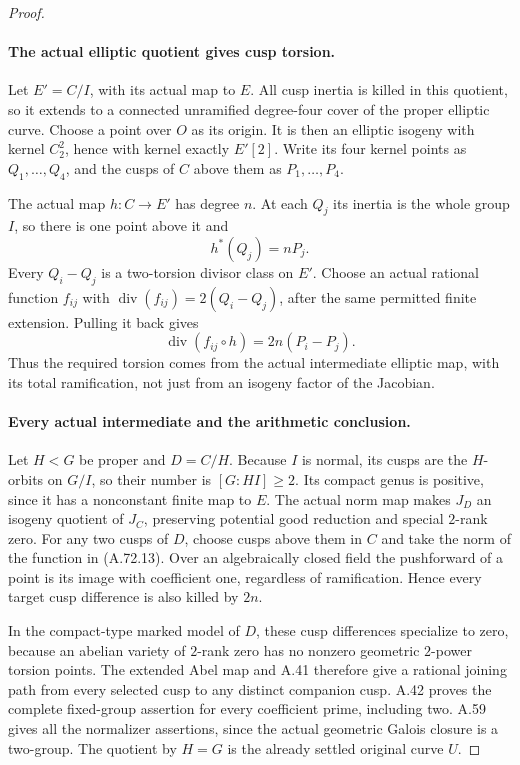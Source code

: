 \begin{proof}
\paragraph{The actual elliptic quotient gives cusp torsion.}
Let \(E'=C/I\), with its actual map to \(E\). All cusp
inertia is killed in this quotient, so it extends to a
connected unramified degree-four cover of the proper
elliptic curve. Choose a point over \(O\) as its origin.
It is then an elliptic isogeny with kernel \(C_2^2\), hence
with kernel exactly \(E'[2]\). Write its four kernel points
as \(Q_1,\ldots,Q_4\), and the cusps of \(C\) above them
as \(P_1,\ldots,P_4\).

The actual map \(h:C\to E'\) has degree \(n\). At each
\(Q_j\) its inertia is the whole group \(I\), so there is
one point above it and
\[
                     h^*(Q_j)=nP_j.
                                                        \tag{A.72.12}
\]
Every \(Q_i-Q_j\) is a two-torsion divisor class on \(E'\).
Choose an actual rational function \(f_{ij}\) with
\(\operatorname{div}(f_{ij})=2(Q_i-Q_j)\), after the same
permitted finite extension. Pulling it back gives
\[
       \operatorname{div}(f_{ij}\circ h)=2n(P_i-P_j).
                                                        \tag{A.72.13}
\]
Thus the required torsion comes from the actual intermediate
elliptic map, with its total ramification, not just from an
isogeny factor of the Jacobian.

\paragraph{Every actual intermediate and the arithmetic conclusion.}
Let \(H<G\) be proper and \(D=C/H\). Because \(I\) is
normal, its cusps are the \(H\)-orbits on \(G/I\), so
their number is \([G:HI]\ge2\). Its compact genus is
positive, since it has a nonconstant finite map to \(E\).
The actual norm map makes \(J_D\) an isogeny quotient
of \(J_C\), preserving potential good reduction and special
\(2\)-rank zero. For any two cusps of \(D\), choose cusps
above them in \(C\) and take the norm of the function in
(A.72.13). Over an algebraically closed field the pushforward
of a point is its image with coefficient one, regardless
of ramification. Hence every target cusp difference is
also killed by \(2n\).

In the compact-type marked model of \(D\), these cusp
differences specialize to zero, because an abelian variety
of \(2\)-rank zero has no nonzero geometric \(2\)-power
torsion points. The extended Abel map and A.41 therefore
give a rational joining path from every selected cusp to
any distinct companion cusp. A.42 proves the complete
fixed-group assertion for every coefficient prime, including
two. A.59 gives all the normalizer assertions, since the
actual geometric Galois closure is a two-group. The quotient
by \(H=G\) is the already settled original curve \(U\).


\end{proof}
